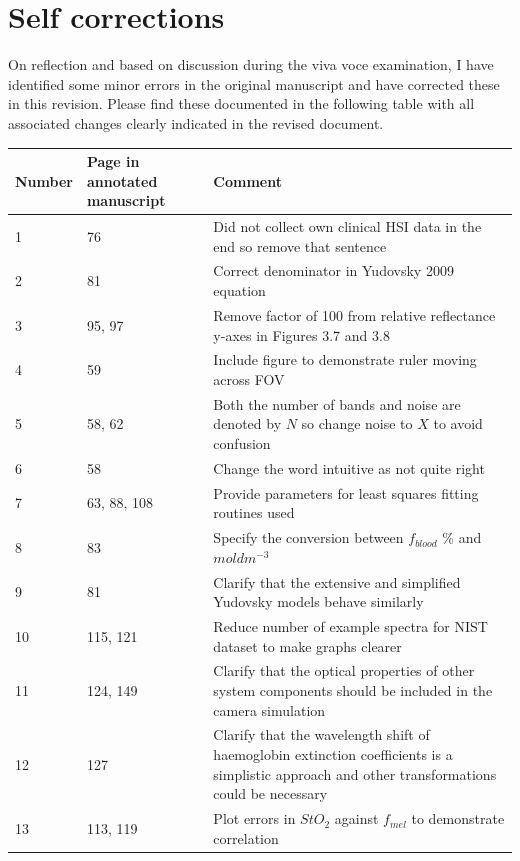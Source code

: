 \documentclass{article}
\begin{document}
\section{Self corrections}
On reflection and based on discussion during the viva voce examination, I have identified some minor errors in the original manuscript and have corrected these in this revision. Please find these documented in the following table with all associated changes clearly indicated in the revised document. 
\begin{table}
    \centering
    \begin{tabular}{|p{1.5cm}|p{2cm}|p{7.5cm}|}
        \hline
        Number & Page in annotated manuscript & Comment \\
        \hline
        1 & 76 & Did not collect own clinical HSI data in the end so remove that sentence \\
        2 & 81 & Correct denominator in Yudovsky 2009 equation \\ 
        3 & 95, 97 & Remove factor of 100 from relative reflectance y-axes in Figures 3.7 and 3.8 \\
        4 & 59 & Include figure to demonstrate ruler moving across FOV \\
        5 & 58, 62 & Both the number of bands and noise are denoted by $N$ so change noise to $X$ to avoid confusion \\ 
        6 & 58 & Change the word intuitive as not quite right \\
        7 & 63, 88, 108 & Provide parameters for least squares fitting routines used \\ 
        8 & 83 & Specify the conversion between $f_{blood}$ \% and $moldm^{-3}$ \\
        9 & 81 & Clarify that the extensive and simplified Yudovsky models behave similarly \\
        10 & 115, 121 & Reduce number of example spectra for NIST dataset to make graphs clearer \\
        11 & 124, 149 & Clarify that the optical properties of other system components should be included in the camera simulation \\ 
        12 & 127 & Clarify that the wavelength shift of haemoglobin extinction coefficients is a simplistic approach and other transformations could be necessary \\
        13 & 113, 119 & Plot errors in $StO_2$ against $f_{mel}$ to demonstrate correlation \\
        \hline
    \end{tabular}
\end{table}


\end{document}
